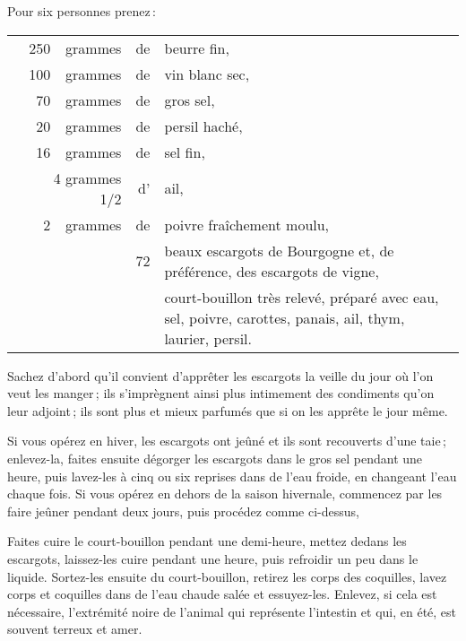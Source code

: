 Pour six personnes prenez :

\medskip

\footnotesize
\begin{longtable}{rrrrp{16em}}   
  & 250 & grammes     & de & beurre fin,                                                                  \\
  & 100 & grammes     & de & vin blanc sec,                                                               \\
  &  70 & grammes     & de & gros sel,                                                                    \\
  &  20 & grammes     & de & persil haché,                                                                \\
  &  16 & grammes     & de & sel fin,                                                                     \\
  & \multicolumn{2}{r}{4 grammes 1/2} & d' & ail,                                                         \\
  &   2 & grammes     & de & poivre fraîchement moulu,                                                    \\
  &     &             & 72 & beaux escargots de Bourgogne et, de préférence, des escargots de vigne,      \\
  &     &             &    & court-bouillon très relevé, préparé avec eau, sel, poivre, carottes,
                             panais, ail, thym, laurier, persil.                                          \\
\end{longtable}
\normalsize

Sachez d'abord qu'il convient d'apprêter les escargots la veille du jour où
l'on veut les manger ; ils s'imprègnent ainsi plus intimement des condiments
qu'on leur adjoint ; ils sont plus et mieux parfumés que si on les apprête le
jour même.

Si vous opérez en hiver, les escargots ont jeûné et ils sont recouverts d'une
taie ; enlevez-la, faites ensuite dégorger les escargots dans le gros sel
pendant une heure, puis lavez-les à cinq ou six reprises dans de l'eau froide,
en changeant l'eau chaque fois. Si vous opérez en dehors de la saison
hivernale, commencez par les faire jeûner pendant deux jours, puis procédez
comme ci-dessus,

Faites cuire le court-bouillon pendant une demi-heure, mettez dedans les
escargots, laissez-les cuire pendant une heure, puis refroidir un peu dans le
liquide. Sortez-les ensuite du court-bouillon, retirez les corps des coquilles,
lavez corps et coquilles dans de l'eau chaude salée et essuyez-les. Enlevez, si
cela est nécessaire, l'extrémité noire de l’animal qui représente l'intestin et
qui, en été, est souvent terreux et amer.

